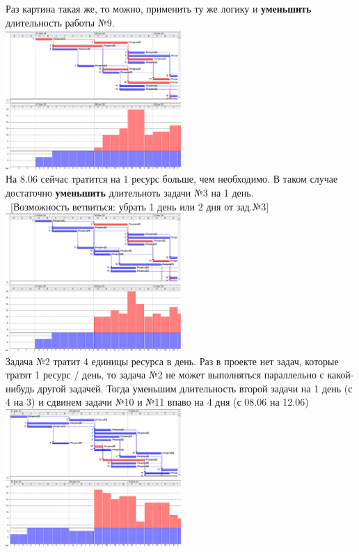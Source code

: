 \documentclass[14pt]{article}
\begin{document}
	Раз картина такая же, то можно, применить ту же логику и \textbf{уменьшить} длительность работы №9.\\
	\includegraphics[width=0.5\textwidth]{../img/ot1a1_3.png}\\
	На 8.06 сейчас тратится на 1 ресурс больше, чем необходимо.
	В таком случае достаточно \textbf{уменьшить} длительноть задачи №3 на 1 день.\\ \
	[Возможность ветвиться: убрать 1 день или 2 дня от зад.№3]\\
	\includegraphics[width=0.5\textwidth]{../img/ot1a1_4.png}\\
	Задача №2 тратит 4 единицы ресурса в день.
	Раз в проекте нет задач, которые тратят 1 ресурс / день, то задача №2
		не может выполняться параллельно с какой-нибудь другой задачей.
	Тогда уменьшим длительность второй задачи на 1 день (с 4 на 3) и сдвинем задачи №10 и №11 впаво на 4 дня (с 08.06 на 12.06)\\
	\includegraphics[width=0.5\textwidth]{../img/ot1a1_5.png}\\
\end{document}
